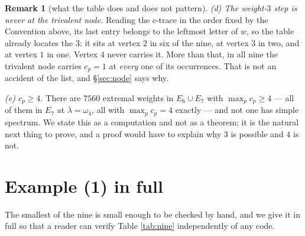 \documentclass[reqno]{amsart}
\theoremstyle{plain}
\theoremstyle{definition}
\newtheorem{remark}[theorem]{Remark}
\newcommand{\la}{\lambda}
\newcommand{\om}{\omega}
\begin{document}
\begin{remark}[what the table does and does not pattern]
\emph{(d) The weight-$3$ step is never at the trivalent node.}  Reading the
$c$-trace in the order fixed by the Convention above, its last entry belongs to
the leftmost letter of $w$, so the table already locates the $3$: it
sits at vertex $2$ in six of the nine, at vertex $3$ in two, and at vertex $1$
in one.  Vertex $4$ never carries it.  More than that, in all nine the
trivalent node carries $c_p=1$ at \emph{every} one of its occurrences.  That is
not an accident of the list, and \S\ref{sec:node} says why.

\emph{(e) $c_p\ge4$.}  There are $7560$ extremal weights in $E_6\cup E_7$ with
$\max_pc_p\ge4$ --- all of them in $E_7$ at $\la=\om_4$, all with
$\max_pc_p=4$ exactly --- and not one has simple spectrum.  We state this as a
computation and not as a theorem; it is the natural next thing to prove, and a
proof would have to explain why $3$ is possible and $4$ is not.
\end{remark}

\section{Example (1) in full}

The smallest of the nine is small enough to be checked by hand, and we give it
in full so that a reader can verify Table \ref{tab:nine} independently of any
code.
\end{document}
